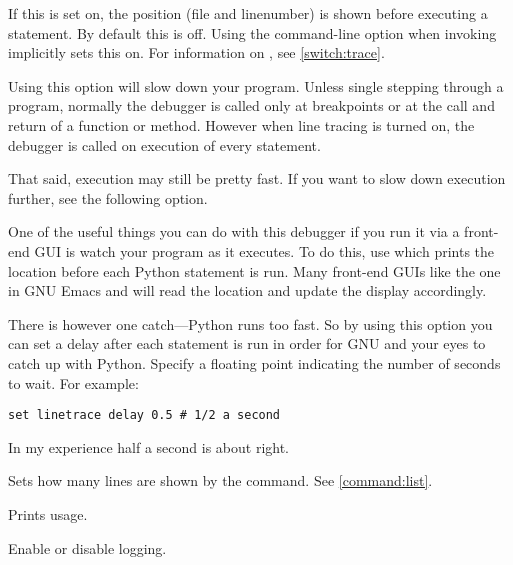 \begin{description}
If this is set on, the position (file and linenumber) is shown before
executing a statement. By default this is off. Using the command-line
option  when invoking  implicitly sets this
on.  For information on , see \ref{switch:trace}.

Using this option will slow down your
program. Unless single stepping through a program, normally the
debugger is called only at breakpoints or at the call and return of a
function or method. However when line tracing is turned on, the
debugger is called on execution of every statement. 

That said, execution may still be pretty fast. If you want to slow
down execution further, see the following option.

\item[set linetrace delay \var{time}]\label{command:linetrace-delay}

One of the useful things you can do with this debugger if you run it
via a front-end GUI is watch your program as it executes. To do this,
use  which prints the location before each
Python statement is run. Many front-end GUIs like the one in GNU Emacs
and  will read the location and update the display
accordingly.

There is however one catch---Python runs too fast. So by using this
option you can set a delay after each statement is run in order for
GNU and your eyes to catch up with Python. Specify a floating
point indicating the number of seconds to wait. For example: 

\begin{verbatim}
set linetrace delay 0.5 # 1/2 a second
\end{verbatim}

In my experience half a second is about right.

\item[set listsize \var{lines}]\label{command:listsize}

Sets how many lines are shown by the  command. See
\ref{command:list}.

\item[set logging]\label{command:logging}

Prints  usage.

\item[set logging on\code{\Large{|}}off]\label{command:logging}

Enable or disable logging.

\item[set logging file \var{filename}]\label{command:log-redirect}


\end{description}
